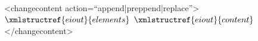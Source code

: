 <changecontent action=``append|preppend|replace''>
  $\xmlstructref{eiout}{elements}$
  $\xmlstructref{eiout}{content}$
</changecontent>
